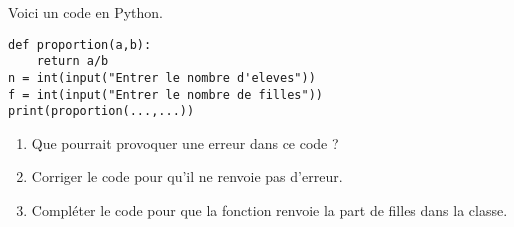 
Voici un code en Python.


\begin{lstlisting}
def proportion(a,b):
	return a/b
n = int(input("Entrer le nombre d'eleves"))
f = int(input("Entrer le nombre de filles"))
print(proportion(...,...))
\end{lstlisting}

 


\begin{enumerate}
\item Que pourrait provoquer une erreur dans ce code ?
\item Corriger le code pour qu'il ne renvoie pas d'erreur.
\item Compléter le code pour que la fonction renvoie la part de filles dans la classe.
\end{enumerate} 